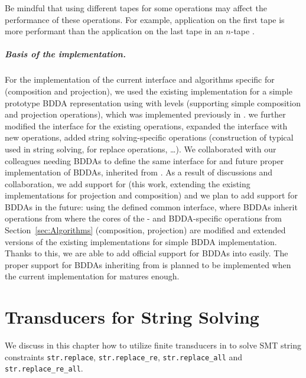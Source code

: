 Be mindful that using different tapes for some operations may affect the performance of these operations. For example, application on the first tape is more performant than the application on the last tape in an $n$-tape \nft.

\paragraph{Basis of the implementation.}
For the implementation of the current interface and algorithms specific for \nfts (composition and projection), we used the existing implementation for a simple prototype BDDA representation using \nfas with levels (supporting simple composition and projection operations), which was implemented previously in \mata.
we further modified the interface for the existing operations, expanded the interface with new operations, added string solving-specific operations (construction of typical \nfts used in string solving, \nfts for replace operations, \ldots).
We collaborated with our colleagues needing BDDAs to define the same interface for \nfts and future proper implementation of BDDAs, inherited from \nfts.
As a result of discussions and collaboration, we add support for \nfts (this work, extending the existing implementations for projection and composition) and we plan to add support for BDDAs in the future: using the defined common interface, where BDDAs inherit operations from \nfts where the cores of the \nft- and BDDA-specific operations from Section~\ref{sec:Algorithms} (composition, projection) are modified and extended versions of the existing implementations for simple BDDA implementation.
Thanks to this, we are able to add official support for BDDAs into \mata easily.
The proper support for BDDAs inheriting from \nfts is planned to be implemented when the current implementation for \nfts matures enough.

\chapter{Transducers for String Solving}

We discuss in this chapter how to utilize finite transducers in \noodler to solve SMT string constraints \texttt{str.replace}, \texttt{str.replace\_re}, \texttt{str.replace\_all} and\\\texttt{str.replace\_re\_all}.

